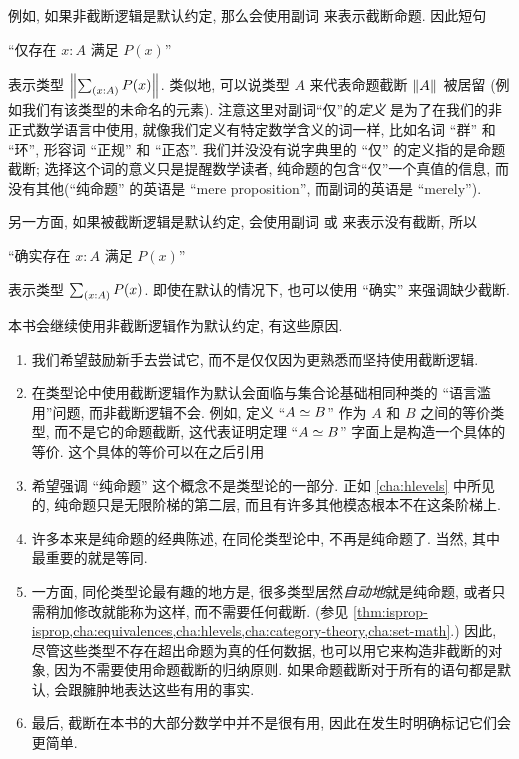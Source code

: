 例如, 如果非截断逻辑是默认约定, 那么会使用副词%
%
来表示截断命题.
因此短句
\begin{center}
    ``仅存在 $x:A$ 满足 $P(x)$''
\end{center}
表示类型 $\brck{\sm{x:A} P(x)}$.
类似地, 可以说类型 $A$ %
%
%
来代表命题截断 $\mathopen{}\left\Vert A\right\Vert_{}\mathclose{}$ 被居留 (例如我们有该类型的未命名的元素).
注意这里对副词``仅''的\emph{定义} 是为了在我们的非正式数学语言中使用, 就像我们定义有特定数学含义的词一样, 比如名词 ``群'' 和 ``环'', 形容词 ``正规'' 和 ``正态''.
我们并没没有说字典里的 ``仅'' 的定义指的是命题截断;
选择这个词的意义只是提醒数学读者, 纯命题的包含``仅''一个真值的信息, 而没有其他(``纯命题'' 的英语是 ``mere proposition'', 而副词的英语是 ``merely'').

另一方面, 如果被截断逻辑是默认约定, 会使用副词%
%
或  来表示没有截断, 所以
\begin{center}
    ``确实存在 $x:A$ 满足 $P(x)$''
\end{center}
表示类型 $\sm{x:A} P(x)$.
即使在默认的情况下, 也可以使用 ``确实'' 来强调缺少截断.

本书会继续使用非截断逻辑作为默认约定, 有这些原因.
\begin{enumerate}[label=(\arabic*)]
    \item 我们希望鼓励新手去尝试它, 而不是仅仅因为更熟悉而坚持使用截断逻辑.
    \item 在类型论中使用截断逻辑作为默认会面临与集合论基础相同种类的 ``语言滥用''问题, 而非截断逻辑不会.
    例如, 定义 ``$A \simeq B$'' 作为 $A$ 和 $B$ 之间的等价类型, 而不是它的命题截断, 这代表证明定理 ``$A \simeq B$'' 字面上是构造一个具体的等价.
    这个具体的等价可以在之后引用
    \item 希望强调 ``纯命题'' 这个概念不是类型论的一部分.
    正如 \cref{cha:hlevels} 中所见的, 纯命题只是无限阶梯的第二层, 而且有许多其他模态根本不在这条阶梯上.
    \item 许多本来是纯命题的经典陈述, 在同伦类型论中, 不再是纯命题了.
    当然, 其中最重要的就是等同.
    \item 一方面, 同伦类型论最有趣的地方是, 很多类型居然\emph{自动地}就是纯命题, 或者只需稍加修改就能称为这样, 而不需要任何截断.
    (参见 \cref{thm:isprop-isprop,cha:equivalences,cha:hlevels,cha:category-theory,cha:set-math}.)
    因此, 尽管这些类型不存在超出命题为真的任何数据, 也可以用它来构造非截断的对象, 因为不需要使用命题截断的归纳原则.
    如果命题截断对于所有的语句都是默认, 会跟臃肿地表达这些有用的事实.
    \item 最后, 截断在本书的大部分数学中并不是很有用, 因此在发生时明确标记它们会更简单.
\end{enumerate}

%
%
